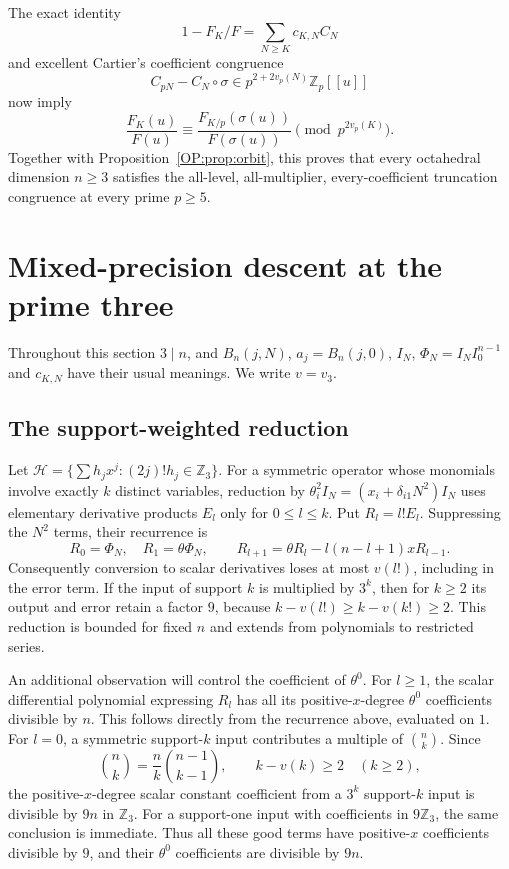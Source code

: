 \documentclass[11pt,a4paper]{article}
\theoremstyle{definition}\newtheorem{definition}[theorem]{Definition}
\theoremstyle{remark}\newtheorem{remark}[theorem]{Remark}
\numberwithin{equation}{section}
\begin{document}
The exact identity
\[
 1-F_K/F=\sum_{N\ge K}c_{K,N}C_N
\]
and excellent Cartier's coefficient congruence
\[
 C_{pN}-C_N\circ\sigma
 \in p^{2+2v_p(N)}\mathbb Z_p[[u]]
\]
now imply
\[
 \frac{F_K(u)}{F(u)}
 \equiv\frac{F_{K/p}(\sigma(u))}{F(\sigma(u))}
 \pmod{p^{2v_p(K)}}.
\]
Together with Proposition~\ref{OP:prop:orbit}, this proves that every octahedral dimension
$n\ge3$ satisfies the all-level, all-multiplier, every-coefficient
truncation congruence at every prime $p\ge5$.
\section{Mixed-precision descent at the prime three}\label{OP:source-main-5}\label{OP:sec:mixed}

Throughout this section $3\mid n$, and $B_n(j,N)$, $a_j=B_n(j,0)$,
$I_N$, $\Phi_N=I_NI_0^{n-1}$ and $c_{K,N}$ have their usual meanings.
We write $v=v_3$.

\subsection{The support-weighted reduction}
Let $\mathcal H=\{\sum h_jx^j:(2j)!h_j\in\mathbb Z_3\}$.
For a symmetric operator whose monomials involve exactly $k$ distinct
variables, reduction by $\theta_i^2I_N=(x_i+\delta_{i1}N^2)I_N$
uses elementary derivative products $E_l$ only for $0\le l\le k$.
Put $R_l=l!E_l$. Suppressing the $N^2$ terms, their recurrence is
\[
 R_0=\Phi_N,\quad R_1=\theta\Phi_N,\qquad
 R_{l+1}=\theta R_l-l(n-l+1)xR_{l-1}.
\]
Consequently conversion to scalar derivatives loses at most $v(l!)$,
including in the error term. If the input of support $k$ is multiplied
by $3^k$, then for $k\ge2$ its output and error retain a factor $9$,
because $k-v(l!)\ge k-v(k!)\ge2$. This reduction is bounded for fixed
$n$ and extends from polynomials to restricted series.

An additional observation will control the coefficient of $\theta^0$.
For $l\ge1$, the scalar differential polynomial expressing $R_l$
has all its positive-$x$-degree $\theta^0$ coefficients divisible by $n$.
This follows directly from the recurrence above, evaluated on $1$.
For $l=0$, a symmetric support-$k$ input contributes a multiple of
$\binom nk$. Since
\[
 \binom nk=\frac nk\binom{n-1}{k-1},
 \qquad k-v(k)\ge2\quad(k\ge2),
\]
the positive-$x$-degree scalar constant coefficient from a $3^k$
support-$k$ input is divisible by $9n$ in $\mathbb Z_3$.
For a support-one input with coefficients in $9\mathbb Z_3$, the same
conclusion is immediate. Thus all these good terms have positive-$x$
coefficients divisible by $9$, and their $\theta^0$ coefficients are
divisible by $9n$.
\end{document}
